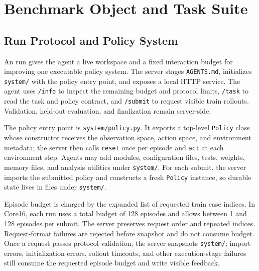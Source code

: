 \appendix

\newpage


\section{Benchmark Object and Task Suite}
\label{app:benchmark-object}

\subsection{Run Protocol and Policy System}
\label{app:protocol-details}

An \evopolicygym{} run gives the agent a live workspace and a fixed interaction
budget for improving one executable policy system. The server stages
\texttt{AGENTS.md}, initializes \texttt{system/} with the policy entry point,
and exposes a local HTTP service. The agent uses \texttt{/info} to inspect the
remaining budget and protocol limits, \texttt{/task} to read the task and
policy contract, and \texttt{/submit} to request visible train rollouts.
Validation, held-out evaluation, and finalization remain server-side.

The policy entry point is \texttt{system/policy.py}. It exports a top-level
\texttt{Policy} class whose constructor receives the observation space, action
space, and environment metadata; the server then calls \texttt{reset} once per
episode and \texttt{act} at each environment step. Agents may add modules,
configuration files, tests, weights, memory files, and analysis utilities under
\texttt{system/}. For each submit, the server imports the submitted policy and
constructs a fresh \texttt{Policy} instance, so durable state lives in files
under \texttt{system/}.

Episode budget is charged by the expanded list of requested train case
indices. In Core16, each run uses a total budget of 128 episodes and allows
between 1 and 128 episodes per submit. The server preserves request order and
repeated indices. Request-format failures are rejected before snapshot and do
not consume budget. Once a request passes protocol validation, the server
snapshots \texttt{system/}; import errors, initialization errors, rollout
timeouts, and other execution-stage failures still consume the requested
episode budget and write visible feedback.

